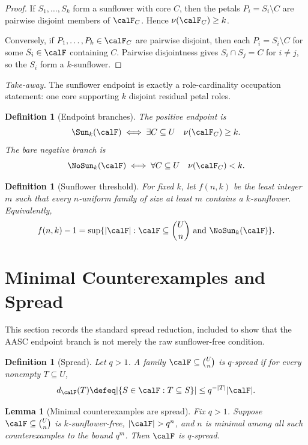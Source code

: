 \documentclass[11pt]{article}
\newtheorem{lemma}[theorem]{Lemma}
\newtheorem{definition}[theorem]{Definition}
\begin{document}
\begin{proof}
If \(S_1,\dots,S_k\) form a sunflower with core \(C\), then the petals \(P_i=S_i\setminus C\) are pairwise disjoint members of \(\calF_C\).  Hence \(\nu(\calF_C)\ge k\).

Conversely, if \(P_1,
\dots,P_k\in\calF_C\) are pairwise disjoint, then each \(P_i=S_i\setminus C\) for some \(S_i\in\calF\) containing \(C\).  Pairwise disjointness gives \(S_i\cap S_j=C\) for \(i\ne j\), so the \(S_i\) form a \(k\)-sunflower.
\end{proof}

\noindent\emph{Take-away.} The sunflower endpoint is exactly a role-cardinality occupation statement: one core supporting \(k\) disjoint residual petal roles.

\begin{definition}[Endpoint branches]
The positive endpoint is
\[
  \Sun_k(\calF)\iff \exists C\subseteq U\quad \nu(\calF_C)\ge k.
\]
The bare negative branch is
\[
  \NoSun_k(\calF)\iff \forall C\subseteq U\quad \nu(\calF_C)<k.
\]
\end{definition}

\begin{definition}[Sunflower threshold]
For fixed \(k\), let \(f(n,k)\) be the least integer \(m\) such that every \(n\)-uniform family of size at least \(m\) contains a \(k\)-sunflower.  Equivalently,
\[
  f(n,k)-1=\sup\{|\calF|:\calF\subseteq\binom{U}{n}\text{ and }\NoSun_k(\calF)\}.
\]
\end{definition}

\section{Minimal Counterexamples and Spread}

This section records the standard spread reduction, included to show that the AASC endpoint branch is not merely the raw sunflower-free condition.

\begin{definition}[Spread]
Let \(q>1\).  A family \(\calF\subseteq\binom{U}{n}\) is \(q\)-spread if for every nonempty \(T\subseteq U\),
\[
  d_{\calF}(T)\defeq |\{S\in\calF:T\subseteq S\}|
  \le q^{-|T|}|\calF|.
\]
\end{definition}

\begin{lemma}[Minimal counterexamples are spread]\label{lem:min-spread}
Fix \(q>1\).  Suppose \(\calF\subseteq\binom{U}{n}\) is \(k\)-sunflower-free, \(|\calF|>q^n\), and \(n\) is minimal among all such counterexamples to the bound \(q^m\).  Then \(\calF\) is \(q\)-spread.
\end{lemma}
\end{document}
